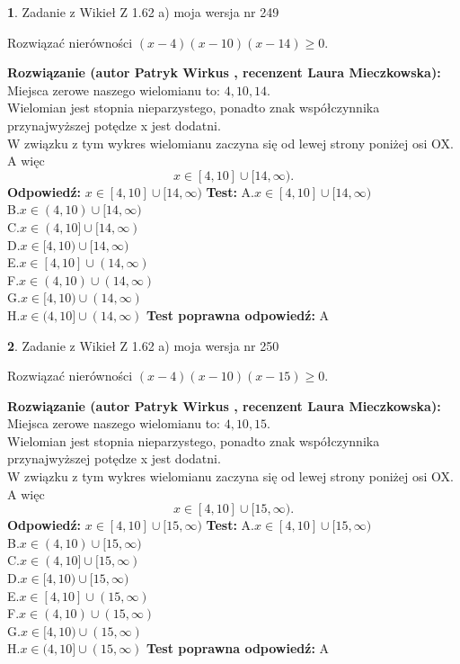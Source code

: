 \documentclass[12pt, a4paper]{article}
\theoremstyle{definition} %
\newtheorem{zad}{}
\newcommand{\zadStart}[1]{\begin{zad}#1\newline}
\newcommand{\zadStop}{\end{zad}}
\newcommand{\rozwStart}[2]{\noindent \textbf{Rozwiązanie (autor #1 , recenzent #2): }\newline}
\newcommand{\rozwStop}{\newline}
\newcommand{\odpStart}{\noindent \textbf{Odpowiedź:}\newline}
\newcommand{\odpStop}{\newline}
\newcommand{\testStart}{\noindent \textbf{Test:}\newline}
\newcommand{\testStop}{\newline}
\newcommand{\kluczStart}{\noindent \textbf{Test poprawna odpowiedź:}\newline}
\newcommand{\kluczStop}{\newline}
\begin{document}
\zadStart{Zadanie z Wikieł Z 1.62 a) moja wersja nr 249}

Rozwiązać nierówności $(x-4)(x-10)(x-14)\ge0$.
\zadStop
\rozwStart{Patryk Wirkus}{Laura Mieczkowska}
Miejsca zerowe naszego wielomianu to: $4, 10, 14$.\\
Wielomian jest stopnia nieparzystego, ponadto znak współczynnika przy\linebreak najwyższej potędze x jest dodatni.\\ W związku z tym wykres wielomianu zaczyna się od lewej strony poniżej osi OX. A więc $$x \in [4,10] \cup [14,\infty).$$
\rozwStop
\odpStart
$x \in [4,10] \cup [14,\infty)$
\odpStop
\testStart
A.$x \in [4,10] \cup [14,\infty)$\\
B.$x \in (4,10) \cup [14,\infty)$\\
C.$x \in (4,10] \cup [14,\infty)$\\
D.$x \in [4,10) \cup [14,\infty)$\\
E.$x \in [4,10] \cup (14,\infty)$\\
F.$x \in (4,10) \cup (14,\infty)$\\
G.$x \in [4,10) \cup (14,\infty)$\\
H.$x \in (4,10] \cup (14,\infty)$
\testStop
\kluczStart
A
\kluczStop



\zadStart{Zadanie z Wikieł Z 1.62 a) moja wersja nr 250}

Rozwiązać nierówności $(x-4)(x-10)(x-15)\ge0$.
\zadStop
\rozwStart{Patryk Wirkus}{Laura Mieczkowska}
Miejsca zerowe naszego wielomianu to: $4, 10, 15$.\\
Wielomian jest stopnia nieparzystego, ponadto znak współczynnika przy\linebreak najwyższej potędze x jest dodatni.\\ W związku z tym wykres wielomianu zaczyna się od lewej strony poniżej osi OX. A więc $$x \in [4,10] \cup [15,\infty).$$
\rozwStop
\odpStart
$x \in [4,10] \cup [15,\infty)$
\odpStop
\testStart
A.$x \in [4,10] \cup [15,\infty)$\\
B.$x \in (4,10) \cup [15,\infty)$\\
C.$x \in (4,10] \cup [15,\infty)$\\
D.$x \in [4,10) \cup [15,\infty)$\\
E.$x \in [4,10] \cup (15,\infty)$\\
F.$x \in (4,10) \cup (15,\infty)$\\
G.$x \in [4,10) \cup (15,\infty)$\\
H.$x \in (4,10] \cup (15,\infty)$
\testStop
\kluczStart
A
\kluczStop
\end{document}
